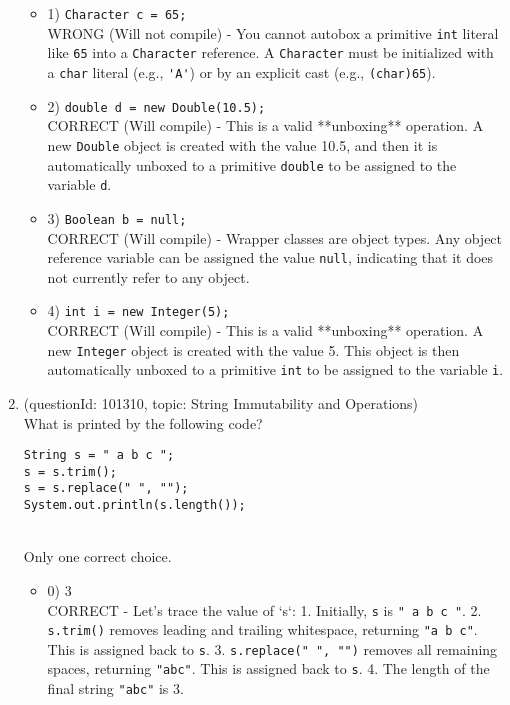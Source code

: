 \documentclass[12pt]{article}
\begin{document}
\begin{enumerate}[label=(\arabic*)]
\begin{itemize}
\item 1) \verb|Character c = 65;|
 \\ 
WRONG (Will not compile) - You cannot autobox a primitive \verb|int| literal like \verb|65| into a \verb|Character| reference. A \verb|Character| must be initialized with a \verb|char| literal (e.g., \verb|'A'|) or by an explicit cast (e.g., \verb|(char)65|).

\item 2) \verb|double d = new Double(10.5);|
 \\ 
CORRECT (Will compile) - This is a valid **unboxing** operation. A new \verb|Double| object is created with the value 10.5, and then it is automatically unboxed to a primitive \verb|double| to be assigned to the variable \verb|d|.

\item 3) \verb|Boolean b = null;|
 \\ 
CORRECT (Will compile) - Wrapper classes are object types. Any object reference variable can be assigned the value \verb|null|, indicating that it does not currently refer to any object.

\item 4) \verb|int i = new Integer(5);|
 \\ 
CORRECT (Will compile) - This is a valid **unboxing** operation. A new \verb|Integer| object is created with the value 5. This object is then automatically unboxed to a primitive \verb|int| to be assigned to the variable \verb|i|.

\end{itemize}
\item (questionId: 101310, topic: String Immutability and Operations) \\ 
What is printed by the following code?
\begin{verbatim}
String s = " a b c ";
s = s.trim();
s = s.replace(" ", "");
System.out.println(s.length());
\end{verbatim}
\\ \noindent Only one correct choice. 
\begin{itemize}
\item 0) 3
 \\ 
CORRECT - Let's trace the value of `s`: 1. Initially, \verb|s| is \verb|" a b c "|. 2. \verb|s.trim()| removes leading and trailing whitespace, returning \verb|"a b c"|. This is assigned back to \verb|s|. 3. \verb|s.replace(" ", "")| removes all remaining spaces, returning \verb|"abc"|. This is assigned back to \verb|s|. 4. The length of the final string \verb|"abc"| is 3.


\end{itemize}
\end{enumerate}
\end{document}
